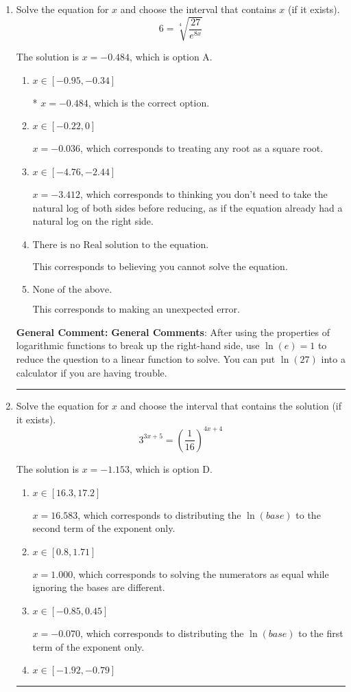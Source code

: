 \documentclass{extbook}[14pt]
\newcommand{\litem}[1]{\item #1

\rule{\textwidth}{0.4pt}}
\begin{document}
\begin{enumerate}\litem{
 Solve the equation for $x$ and choose the interval that contains $x$ (if it exists).
\[  6 = \sqrt[4]{\frac{27}{e^{8x}}} \]

The solution is \( x = -0.484 \), which is option A.\begin{enumerate}[label=\Alph*.]
\item \( x \in [-0.95, -0.34] \)

* $x = -0.484$, which is the correct option.
\item \( x \in [-0.22, 0] \)

$x = -0.036$, which corresponds to treating any root as a square root.
\item \( x \in [-4.76, -2.44] \)

$x = -3.412$, which corresponds to thinking you don't need to take the natural log of both sides before reducing, as if the equation already had a natural log on the right side.
\item \( \text{There is no Real solution to the equation.} \)

This corresponds to believing you cannot solve the equation.
\item \( \text{None of the above.} \)

This corresponds to making an unexpected error.
\end{enumerate}

\textbf{General Comment:} \textbf{General Comments}: After using the properties of logarithmic functions to break up the right-hand side, use $\ln(e) = 1$ to reduce the question to a linear function to solve. You can put $\ln(27)$ into a calculator if you are having trouble.
}
\litem{
Solve the equation for $x$ and choose the interval that contains the solution (if it exists).
\[ 3^{3x+5} = \left(\frac{1}{16}\right)^{4x+4} \]

The solution is \( x = -1.153 \), which is option D.\begin{enumerate}[label=\Alph*.]
\item \( x \in [16.3, 17.2] \)

$x = 16.583$, which corresponds to distributing the $\ln(base)$ to the second term of the exponent only.
\item \( x \in [0.8, 1.71] \)

$x = 1.000$, which corresponds to solving the numerators as equal while ignoring the bases are different.
\item \( x \in [-0.85, 0.45] \)

$x = -0.070$, which corresponds to distributing the $\ln(base)$ to the first term of the exponent only.
\item \( x \in [-1.92, -0.79] \)


\end{enumerate}}
\end{enumerate}
\end{document}
